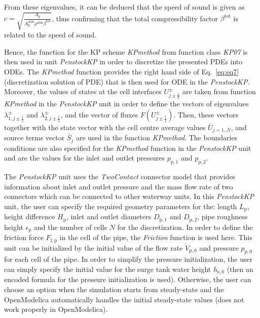 \documentclass[%
]{USN-PhD}
\begin{document}
From these eigenvalues, it can be deduced that the speed of sound is given as $c=\sqrt{\frac{A_\mathrm{p}}{A_\mathrm{p}^{\text{atm}}\rho^{\text{atm}}\beta^\mathrm{tot}}}$, thus confirming that the total compressibility factor $\beta^\mathrm{tot}$ is related to the speed of sound.

Hence, the function for the KP scheme \emph{KPmethod} from function class \emph{KP07} is then used in unit \emph{PenstockKP} in order to discretize the presented PDEs into ODEs. The \emph{KPmethod} function provides the right hand side of Eq.~\ref{eq:eq7} (discretization solution of PDE) that is then used for ODE in the \emph{PenstockKP}. Moreover, the values of states at the cell interfaces $U^\pm_{j\pm\frac{1}{2}}$ are taken from function \emph{KPmethod} in the \emph{PenstockKP} unit in order to define the vectors of eigenvalues $\lambda^\pm_{1,j\pm\frac{1}{2}}$ and $\lambda^\pm_{2,j\pm\frac{1}{2}}$, and the vector of fluxes $F\left(U^\pm_{j\pm\frac{1}{2}}\right)$. Then, these vectors together with the state vector with the cell centre average values $\bar{U}_{j=1..N}$, and source terms vector $\bar{S}_j$ are used in the function \emph{KPmethod}. The boundaries conditions are also specified for the \emph{KPmethod} function in the \emph{PenstockKP} unit and are the values for the inlet and outlet pressures $p_\mathrm{p,1}$ and $p_\mathrm{p,2}$.

The \emph{PenstockKP} unit uses the \emph{TwoContact} connector model that provides information about inlet and outlet pressure and the mass flow rate of two connectors which can be connected to other waterway units. In this \emph{PenstockKP} unit, the user can specify the required geometry parameters for the: length $L_\mathrm{p}$, height difference $H_\mathrm{p}$, inlet and outlet diameters $D_\mathrm{p,1}$ and $D_\mathrm{p,2}$, pipe roughness height $\epsilon_\mathrm{p}$ and the number of cells $N$ for the discretization. In order to define the friction force $F_\mathrm{f,p}$ in the cell of the pipe, the \emph{Friction} function is used here. This unit can be initialized by the initial value of the flow rate $\dot{V}_\mathrm{p,0}$ and pressure $p_\mathrm{p,0}$ for each cell of the pipe. In order to simplify the pressure initialization, the user can simply specify the initial value for the surge tank water height $h_\mathrm{s,0}$ (then an encoded formula for the pressure initialization is used). Otherwise, the user can choose an option when the simulation starts from steady-state and the OpenModelica automatically handles the initial steady-state values (does not work properly in OpenModelica).
\end{document}
